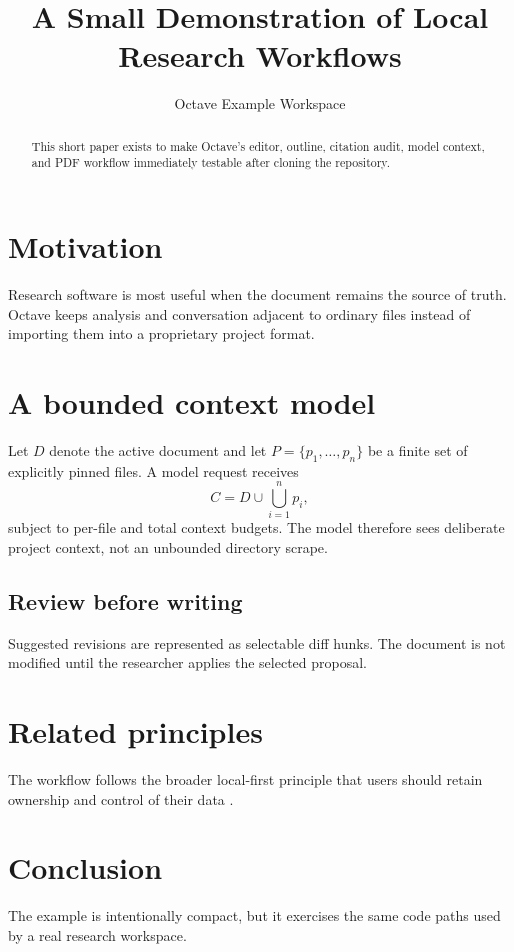 \documentclass[11pt]{article}
\title{A Small Demonstration of Local Research Workflows}
\author{Octave Example Workspace}
\begin{document}
\maketitle

\begin{abstract}
This short paper exists to make Octave's editor, outline, citation audit, model context, and PDF workflow immediately testable after cloning the repository.
\end{abstract}

\section{Motivation}
Research software is most useful when the document remains the source of truth. Octave keeps analysis and conversation adjacent to ordinary files instead of importing them into a proprietary project format.

\section{A bounded context model}
Let $D$ denote the active document and let $P = \{p_1,\ldots,p_n\}$ be a finite set of explicitly pinned files. A model request receives
\[
  C = D \cup \bigcup_{i=1}^{n} p_i,
\]
subject to per-file and total context budgets. The model therefore sees deliberate project context, not an unbounded directory scrape.

\subsection{Review before writing}
Suggested revisions are represented as selectable diff hunks. The document is not modified until the researcher applies the selected proposal.

\section{Related principles}
The workflow follows the broader local-first principle that users should retain ownership and control of their data \cite{localfirst}.

\section{Conclusion}
The example is intentionally compact, but it exercises the same code paths used by a real research workspace.



\end{document}
